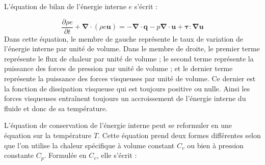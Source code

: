 L'\'equation de bilan de l'\'energie interne $e$ s'\'ecrit \cite[p. 126]{Book_Candel}
:

\begin{equation}
\frac{\partial\rho e}{\partial t}+\boldsymbol{\nabla}\cdot(\rho e\mathbf{u})=-\boldsymbol{\nabla}\cdot\mathbf{q}-p\boldsymbol{\nabla}\cdot\mathbf{u}+\boldsymbol{\tau}:\boldsymbol{\nabla}\mathbf{u}\label{eq:Energie}
\end{equation}
Dans cette \'equation, le membre de gauche repr\'esente le taux de variation
de l'\'energie interne par unit\'e de volume. Dans le membre de droite,
le premier terme repr\'esente le flux de chaleur par unit\'e de volume
; le second terme repr\'esente la puissance des forces de pression par
unit\'e de volume ; et le dernier terme repr\'esente la puissance des
forces visqueuses par unit\'e de volume. Ce dernier est la fonction
de dissipation visqueuse qui est toujours positive ou nulle. Ainsi
les forces visqueuses entra\^inent toujours un accroissement de l'\'energie
interne du fluide et donc de sa temp\'erature.

L'\'equation de conservation de l'\'energie interne peut se reformuler
en une \'equation sur la temp\'erature $T$. Cette \'equation prend deux
formes diff\'erentes selon que l'on utilise la chaleur sp\'ecifique \`a
volume constant $C_{v}$ ou bien \`a pression constante $C_{p}$. Formul\'ee
en $C_{v}$, elle s'\'ecrit :

